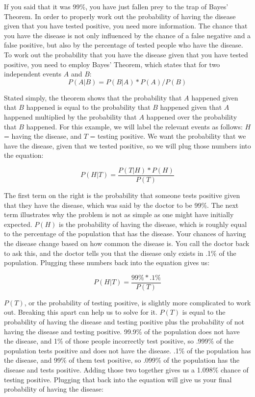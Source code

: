 If you said that it was 99\%, you have just fallen prey to the trap of Bayes’ Theorem. In order to properly work out the probability of having the disease given that you have tested positive, you need more information. The chance that you have the disease is not only influenced by the chance of a false negative and a false positive, but also by the percentage of tested people who have the disease. To work out the probability that you have the disease given that you have tested positive, you need to employ Bayes’ Theorem, which states that for two independent events \(A\) and \(B\):\@
\[P(A|B) = P(B|A) * P(A) / P(B)\]

Stated simply, the theorem shows that the probability that \(A\) happened given that \(B\) happened is equal to the probability that \(B\) happened given that \(A\) happened multiplied by the probability that \(A\) happened over the probability that \(B\) happened. For this example, we will label the relevant events as follows: \(H\) = having the disease, and \(T\) = testing positive. We want the probability that we have the disease, given that we tested positive, so we will plug those numbers into the equation:

\[P(H|T) = \frac{P(T|H) * P(H)}{P(T)}\]

The first term on the right is the probability that someone tests positive given that they have the disease, which was said by the doctor to be 99\%. The next term illustrates why the problem is not as simple as one might have initially expected. \(P(H)\) is the probability of having the disease, which is roughly equal to the percentage of the population that has the disease. Your chances of having the disease change based on how common the disease is. You call the doctor back to ask this, and the doctor tells you that the disease only exists in .1\% of the population. Plugging these numbers back into the equation gives us:

\[P(H|T) = \frac{99\% * .1\%}{P(T)}\]

\(P(T)\), or the probability of testing positive, is slightly more complicated to work out. Breaking this apart can help us to solve for it. \(P(T)\) is equal to the probability of having the disease and testing positive plus the probability of not having the disease and testing positive. 99.9\% of the population does not have the disease, and 1\% of those people incorrectly test positive, so .999\% of the population tests positive and does not have the disease. .1\% of the population has the disease, and 99\% of them test positive, so .099\% of the population has the disease and tests positive. Adding those two together gives us a 1.098\% chance of testing positive. Plugging that back into the equation will give us your final probability of having the disease:

